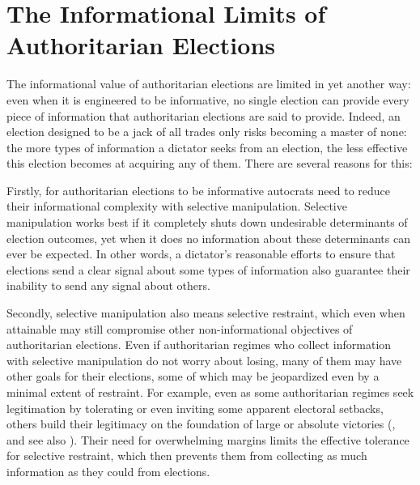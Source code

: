 \documentclass[12pt]{article}
\newcommand{\1}{\mathbbm{1}}
\begin{document}
\section{The Informational Limits of Authoritarian Elections}
\label{sec:theory_limits}

The informational value of authoritarian elections are limited in yet another way: even when it is engineered to be informative, no single election can provide every piece of information that authoritarian elections are said to provide. Indeed, an election designed to be a jack of all trades only risks becoming a master of none: the more types of information a dictator seeks from an election, the less effective this election becomes at acquiring any of them. There are several reasons for this:

Firstly, for authoritarian elections to be informative autocrats need to reduce their informational complexity with selective manipulation. Selective manipulation works best if it completely shuts down undesirable determinants of election outcomes, yet when it does no information about these determinants can ever be expected. In other words, a dictator's reasonable efforts to ensure that elections send a clear signal about some types of information also guarantee their inability to send any signal about others.

Secondly, selective manipulation also means selective restraint, which even when attainable may still compromise other non-informational objectives of authoritarian elections. Even if authoritarian regimes who collect information with selective manipulation do not worry about losing, many of them may have other goals for their elections, some of which may be jeopardized even by a minimal extent of restraint. For example, even as some authoritarian regimes seek legitimation by tolerating or even inviting some apparent electoral setbacks, others build their legitimacy on the foundation of large or absolute victories (\citet{Morgenbesser2016}, and see also \citet{Simpser2013, Geddes2018}). Their need for overwhelming margins limits the effective tolerance for selective restraint, which then prevents them from collecting as much information as they could from elections.
\end{document}
